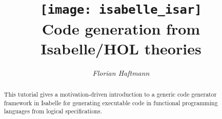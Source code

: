 \documentclass[12pt,a4paper,fleqn]{report}
\title{\texttt{[image: isabelle\_isar]}
  \\[4ex] Code generation from Isabelle/HOL theories}
\author{\emph{Florian Haftmann}}
\begin{document}
\maketitle

\begin{abstract}
  This tutorial gives a motivation-driven introduction
  to a generic code generator framework in Isabelle
  for generating executable code in functional
  programming languages from logical specifications.
\end{abstract}

\thispagestyle{empty}\clearpage

\clearfirst



\begingroup
 \small\raggedright\frenchspacing

\endgroup
\end{document}
